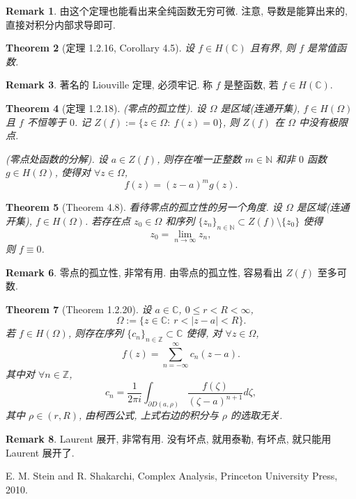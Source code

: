 \documentclass[a4paper,11pt]{article}
\newtheorem{theorem}{Theorem}[section]
\theoremstyle{definition}
\newtheorem{remark}[theorem]{Remark}
\begin{document}
\begin{CJK*}{UTF8}{gbsn}
\begin{remark}
    由这个定理也能看出来全纯函数无穷可微.
    注意, 导数是能算出来的, 直接对积分内部求导即可.
\end{remark}

\begin{theorem}[定理 1.2.16, Corollary 4.5]
    设 $ f \in H(\mathbb{C}) $ 且有界, 则 $ f $ 是常值函数.
\end{theorem}

\begin{remark}
    著名的 Liouville 定理, 必须牢记. 
    称 $ f $ 是整函数, 若 $ f \in H(\mathbb{C}) $.
\end{remark}

\begin{theorem}[定理 1.2.18]
    (零点的孤立性). 设 $ \Omega $ 是区域(连通开集), $ f \in H(\Omega) $ 且 $ f $ 不恒等于 $ 0 $.
    记 $ Z(f) := \{z \in \Omega :\ f(z) = 0\} $, 则 $ Z(f) $ 在 $ \Omega $ 中没有极限点.
    
    (零点处函数的分解). 设 $ a \in Z(f) $, 则存在唯一正整数 $ m \in \mathbb{N} $ 
    和非 $ 0 $ 函数 $ g \in H(\Omega) $, 使得对 $ \forall z \in \Omega $,
    $$
        f(z) = (z - a)^m g(z).
    $$
\end{theorem}

\begin{theorem}[Theorem 4.8]
    看待零点的孤立性的另一个角度.
    设 $ \Omega $ 是区域(连通开集), $ f \in H(\Omega) $.
    若存在点 $ z_0 \in \Omega $ 和序列 $ \{z_n\}_{n \in \mathbb{N}} \subset Z(f) \setminus \{z_0\} $ 使得
    $$
        z_0 = \lim_{n \to \infty} z_n,
    $$
    则 $ f \equiv 0 $.
\end{theorem}

\begin{remark}
    零点的孤立性, 非常有用. 由零点的孤立性, 容易看出 $ Z(f) $ 至多可数.
\end{remark}

\begin{theorem}[Theorem 1.2.20]
    设 $ a \in \mathbb{C} $, $ 0 \leq r < R < \infty $, 
    $$ \Omega := \{z \in \mathbb{C} :\ r < |z - a| < R \}. $$
    若 $ f \in H(\Omega) $, 则存在序列 $ \{c_n\}_{n \in \mathbb{Z}} \subset \mathbb{C} $ 使得, 
    对 $ \forall z \in \Omega $,
    $$
        f(z) = \sum_{n=-\infty}^\infty c_n (z - a).
    $$
    其中对 $ \forall n \in \mathbb{Z} $,
    $$
        c_n = \frac{1}{2 \pi i} \int_{\partial D(a, \rho)} \frac{f(\zeta)}{(\zeta - a)^{n+1}} d\zeta,
    $$
    其中 $ \rho \in (r, R) $, 由柯西公式, 上式右边的积分与 $ \rho $ 的选取无关.
\end{theorem}

\begin{remark}
    Laurent 展开, 非常有用. 没有坏点, 就用泰勒, 有坏点, 就只能用 Laurent 展开了.
\end{remark}

\begin{thebibliography}{99}

      E. M. Stein and R. Shakarchi, Complex Analysis, Princeton University Press, 2010.
    
\end{thebibliography}

\end{CJK*}
\end{document}
